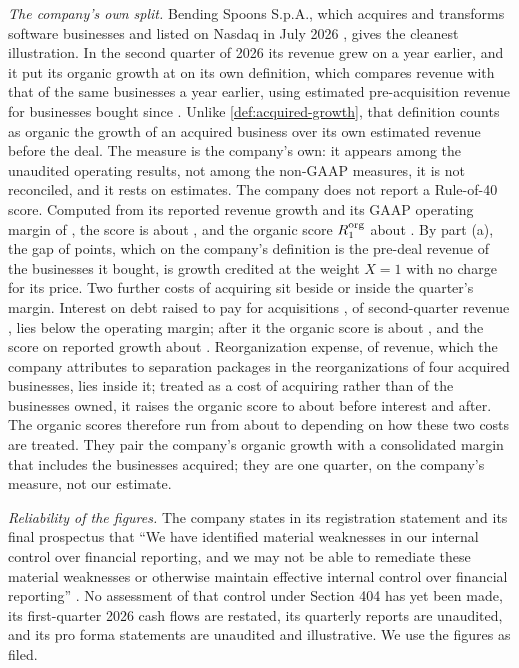 \noindent\emph{The company's own split.} Bending Spoons S.p.A., which acquires and transforms software businesses and listed on Nasdaq in July 2026 \citep{dealroom2026ipo}, gives the cleanest illustration. In the second quarter of 2026 its revenue grew \acqQTwoG{} on a year earlier, and it put its organic growth at \acqQTwoOrg{} on its own definition, which compares revenue with that of the same businesses a year earlier, using estimated pre-acquisition revenue for businesses bought since \citep{bendingspoons2026sixk}. Unlike \autoref{def:acquired-growth}, that definition counts as organic the growth of an acquired business over its own estimated revenue before the deal. The measure is the company's own: it appears among the unaudited operating results, not among the non-GAAP measures, it is not reconciled, and it rests on estimates. The company does not report a Rule-of-40 score. Computed from its reported revenue growth and its GAAP operating margin of \acqQTwoM, the score is about \acqRQTwoRep, and the organic score $R^{\rm org}_1$ about \acqRQTwoOrg. By part (a), the gap of \acqRQTwoGap{} points, which on the company's definition is the pre-deal revenue of the businesses it bought, is growth credited at the weight $X=1$ with no charge for its price. Two further costs of acquiring sit beside or inside the quarter's margin. Interest on debt raised to pay for acquisitions \citep{bendingspoons2026prospectus}, \acqQTwoInt{} of second-quarter revenue \citep{bendingspoons2026sixk}, lies below the operating margin; after it the organic score is about \acqRQTwoOrgIntR, and the score on reported growth about \acqRQTwoRepIntR. Reorganization expense, \acqQTwoReorgX{} of revenue, which the company attributes to separation packages in the reorganizations of four acquired businesses, lies inside it; treated as a cost of acquiring rather than of the businesses owned, it raises the organic score to about \acqRQTwoOrgNoReorgR{} before interest and \acqRQTwoOrgIntNoReorgR{} after. The organic scores therefore run from about \acqRQTwoOrgIntR{} to \acqRQTwoOrgNoReorgR{} depending on how these two costs are treated. They pair the company's organic growth with a consolidated margin that includes the businesses acquired; they are one quarter, on the company's measure, not our estimate.

\noindent\emph{Reliability of the figures.} The company states in its registration statement and its final prospectus that ``We have identified material weaknesses in our internal control over financial reporting, and we may not be able to remediate these material weaknesses or otherwise maintain effective internal control over financial reporting'' \citep{bendingspoons2026f1,bendingspoons2026prospectus}. No assessment of that control under Section 404 has yet been made, its first-quarter 2026 cash flows are restated, its quarterly reports are unaudited, and its pro forma statements are unaudited and illustrative. We use the figures as filed.

